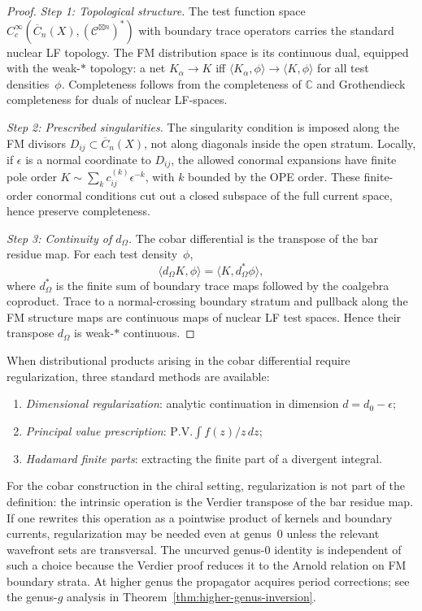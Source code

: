 \begin{proof}
\emph{Step 1: Topological structure.}
The test function space
$C_c^\infty(\overline{C}_n(X),(\mathcal{C}^{\boxtimes n})^*)$ with
boundary trace operators carries the standard nuclear LF topology. The
FM distribution space is its continuous dual, equipped with the
weak-$*$ topology: a net $K_\alpha\to K$ iff
$\langle K_\alpha,\phi\rangle\to\langle K,\phi\rangle$ for all test
densities~$\phi$. Completeness follows from the completeness of
$\mathbb{C}$ and Grothendieck completeness for duals of nuclear
LF-spaces.

\emph{Step 2: Prescribed singularities.}
The singularity condition is imposed along the FM divisors
$D_{ij}\subset\overline{C}_n(X)$, not along diagonals inside the open
stratum. Locally, if $\epsilon$ is a normal coordinate to $D_{ij}$, the
allowed conormal expansions have finite pole order
$K\sim\sum_k c_{ij}^{(k)}\epsilon^{-k}$, with $k$ bounded by the OPE
order. These finite-order conormal conditions cut out a closed subspace
of the full current space, hence preserve completeness.

\emph{Step 3: Continuity of $d_\Omega$.}
The cobar differential is the transpose of the bar residue map. For
each test density~$\phi$,
\[
\langle d_\Omega K,\phi\rangle
=\langle K,d_\Omega^*\phi\rangle,
\]
where $d_\Omega^*$ is the finite sum of boundary trace maps followed
by the coalgebra coproduct. Trace to a normal-crossing boundary stratum
and pullback along the FM structure maps are continuous maps of nuclear
LF test spaces. Hence their transpose $d_\Omega$ is weak-$*$ continuous.
\end{proof}

\begin{remark}\label{rem:regularization-methods}
When distributional products arising in the cobar differential require regularization, three standard methods are available:
\begin{enumerate}
\item \emph{Dimensional regularization}: analytic continuation in dimension $d = d_0 - \epsilon$;
\item \emph{Principal value prescription}: $\mathrm{P.V.}\int f(z)/z\,dz$;
\item \emph{Hadamard finite parts}: extracting the finite part of a divergent integral.
\end{enumerate}
For the cobar construction in the chiral setting, regularization is not
part of the definition: the intrinsic operation is the Verdier
transpose of the bar residue map. If one rewrites this operation as a
pointwise product of kernels and boundary currents, regularization may
be needed even at genus~$0$ unless the relevant wavefront sets are
transversal. The uncurved genus-$0$ identity is independent of such a
choice because the Verdier proof reduces it to the Arnold relation on
FM boundary strata. At higher genus the propagator acquires period
corrections; see the genus-$g$ analysis in
Theorem~\ref{thm:higher-genus-inversion}.
\end{remark}

